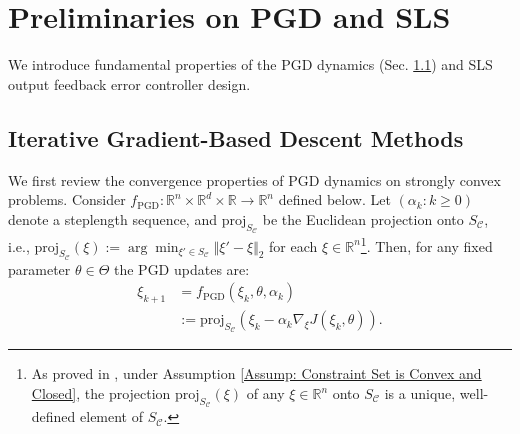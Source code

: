 \documentclass[letterpaper, 10 pt, conference]{ieeeconf}
\newcommand{\ra}{\rightarrow}
\newcommand{\R}{\mathbb{R}}
\newcommand{\?}{\stackrel{?}{=}}
\newcommand{\obj}{J}
\newcommand{\param}{\theta}
\newcommand{\paramDim}{d}
\newcommand{\paramSet}{\Theta}
\newcommand{\var}{\xi}
\newcommand{\varDim}{n}
\newcommand{\ratePGD}{\alpha}
\newcommand{\dynamicsPGD}{f_{\text{PGD}}}
\newcommand{\proj}{\text{proj}}
\newcommand{\constraintSet}{{S_{\mathcal{C}}}}
\newcommand{\antoine}[1]{{\textcolor[rgb]{1,0,0}{\textsf{[Antoine: {#1}]}}}}
\begin{document}
\section{Preliminaries on PGD and SLS}
\label{sec: Preliminaries on Projected Gradient Descent (PGD) and System Level Synthesis (SLS)}

We introduce fundamental properties of the PGD dynamics (Sec. \ref{subsec: Iterative Gradient-Based Descent Methods}) and SLS output feedback error controller design.

\subsection{Iterative Gradient-Based Descent Methods}
\label{subsec: Iterative Gradient-Based Descent Methods}

We first review the convergence properties of
PGD dynamics on strongly convex problems.
Consider
$f_{\text{PGD}}: \R^\varDim \times \R^\paramDim \times \R \ra \R^\varDim$ defined below.
Let $(\ratePGD_k: k \geq 0)$ denote a steplength sequence, and $\proj_\constraintSet$ be the Euclidean projection onto $\constraintSet$,
i.e., $\proj_\constraintSet(\var) := \arg\min_{\var' \in \constraintSet} \Vert \var' - \var \Vert_2$ for each $\var \in \R^\varDim$\footnote{
As proved in \cite[Ch. 7]{WrightRecht2022OptimizationForDataAnalysis}, under Assumption \ref{Assump: Constraint Set is Convex and Closed}, the projection $\proj_\constraintSet(\var)$ of any $\var \in \R^\varDim$ onto $\constraintSet$ is a unique, well-defined element of $\constraintSet$.}.
Then, for any fixed parameter $\param \in \paramSet$
the PGD updates are:
{
\setlength{\abovedisplayskip}{3.5pt}
\setlength{\belowdisplayskip}{3.5pt}
\begin{align} 
\label{Eqn: PGD Updates Notation}
    \var_{k+1} &= \dynamicsPGD(\var_k, \param, \ratePGD_k) \\ \label{Eqn: Projected Gradient Descent (PGD)}
    &:= \proj_\constraintSet\left( \var_k - \ratePGD_k \nabla_\var \obj(\var_k, \param) \right).
\end{align}
}
\end{document}
